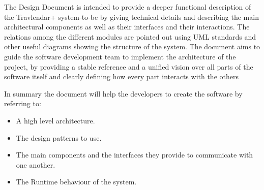 The Design Document is intended to provide a deeper functional description of the Travlendar+ system-to-be by giving technical details and describing the main architectural components as well as their interfaces and their interactions. The relations among the different modules are pointed out using UML standards and other useful diagrams showing the structure of the system. The document aims to guide the software development team to implement the architecture of the project, by providing a stable reference and a unified vision over all parts of the software itself and clearly defining how every part interacts with the others

In summary the document will help the developers to create the software by referring to:

\begin{itemize}
\item A high level architecture. 
\item The design patterns to use.
\item The main components and the interfaces they provide to communicate with one another.
\item The Runtime behaviour of the system.

\end{itemize}